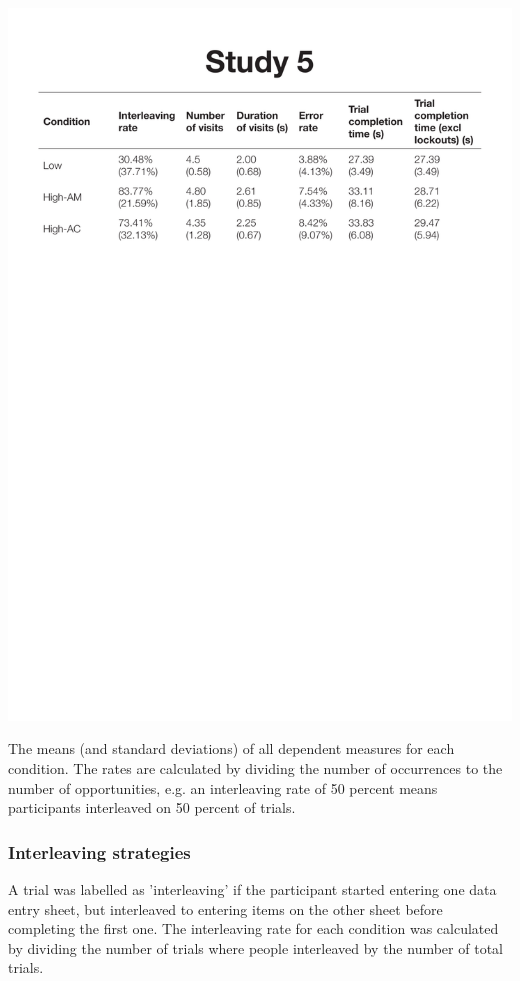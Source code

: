 \begin{table}
 \includegraphics[width=\textwidth]{images/ch34/ch34_5-means.pdf}
\caption[Study 5 means and SDs of dependent measures]{The means (and standard deviations) of all dependent measures for each condition. The rates are calculated by dividing the number of occurrences to the number of opportunities, e.g. an interleaving rate of 50 percent means participants interleaved on 50 percent of trials.}
\label{tbl:ch34_5-means}
\end{table}

\subsubsection{Interleaving strategies}
A trial was labelled as 'interleaving' if the participant started entering one data entry sheet, but interleaved to entering items on the other sheet before completing the first one. The interleaving rate for each condition was calculated by dividing the number of trials where people interleaved by the number of total trials. 

